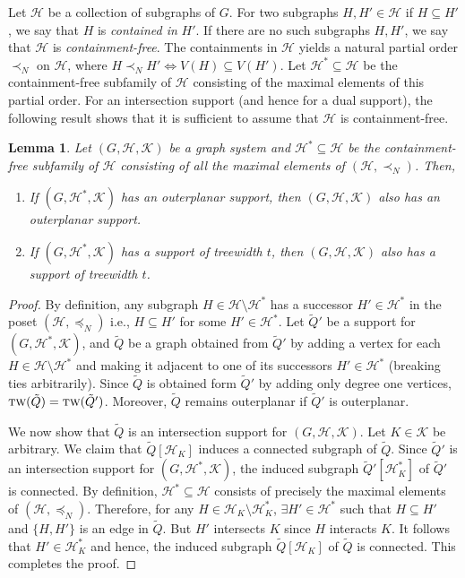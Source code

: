 \documentclass[12pt]{article}
\newcommand{\tw}{\textsc{tw}}
\newtheorem{lemma}[theorem]{Lemma}
\theoremstyle{case}
\begin{document}
Let $\mathcal{H}$ be a collection of subgraphs of $G$. For two subgraphs $H, H'\in\mathcal{H}$ 
if $H\subseteq H'$, we say that $H$ is \emph{contained in} $H'$. If there are no such subgraphs $H, H'$, we say that
$\mathcal{H}$ is \emph{containment-free}. The containments in $\mathcal{H}$ yields a natural partial order $\prec_N$ on $\mathcal{H}$,
where $H\prec_N H' \Leftrightarrow V(H)\subseteq V(H')$.
Let $\mathcal{H}^*\subseteq\mathcal{H}$ be the containment-free subfamily of $\mathcal{H}$ consisting of the maximal elements of this partial order.
For an intersection support (and hence for a dual support), 
the following result 
shows that it is sufficient to 
assume that $\mathcal{H}$ is containment-free.

\begin{lemma}
\label{lem:contfree}
Let $(G,\mathcal{H,K})$ be a graph system and  $\mathcal{H}^*\subseteq\mathcal{H}$ be the containment-free
subfamily of $\mathcal{H}$ consisting of all the maximal elements of $(\mathcal{H},\prec_N)$.
Then,
\begin{enumerate}
    \item If $(G,\mathcal{H^*,K})$ has an outerplanar support, then $(G,\mathcal{H,K})$ also has an outerplanar support.
    \item If $(G,\mathcal{H^*,K})$ has a support of treewidth $t$, then $(G,\mathcal{H,K})$ also has a support of treewidth $t$.
\end{enumerate}

\end{lemma}
\begin{proof}
By definition, any subgraph $H\in\mathcal{H}\setminus\mathcal{H}^*$ has a successor $H'\in\mathcal{H}^*$ in the poset $(\mathcal{H},\preceq_N)$ i.e., $H\subseteq H'$ for some $H'\in\mathcal{H}^*$.
Let $\tilde{Q}'$ be a support for $(G,\mathcal{H}^*,\mathcal{K})$, and $\tilde{Q}$ be a graph obtained from $\tilde{Q}'$ by adding a vertex for each $H\in\mathcal{H}\setminus\mathcal{H}^*$ and making it adjacent to one of its successors $H'\in\mathcal{H}^*$ (breaking ties arbitrarily).
Since $\tilde{Q}$ is obtained form $\tilde{Q}'$ by adding only degree one vertices, $\tw(\tilde{Q})=\tw(\tilde{Q}')$. Moreover, $\tilde{Q}$ remains outerplanar if $\tilde{Q}'$ is outerplanar.

We now show that $\tilde{Q}$ is an intersection support for $(G,\mathcal{H,K})$.
Let $K\in\mathcal{K}$ be arbitrary.
We claim that $\tilde{Q}[\mathcal{H}_K]$ induces a connected subgraph of $\tilde{Q}$.
Since $\tilde{Q}'$ is an intersection support for $(G,\mathcal{H}^*,\mathcal{K})$, the induced subgraph $\tilde{Q}'[\mathcal{H}^*_K]$ of $\tilde{Q}'$ is connected.
By definition, $\mathcal{H}^*\subseteq\mathcal{H}$ consists of precisely the maximal elements of $(\mathcal{H},\preceq_N)$.
Therefore, for any $H\in\mathcal{H}_K\setminus\mathcal{H}^*_K$, $\exists H'\in\mathcal{H}^*$ such that $H\subseteq H'$ and $\{H,H'\}$ is an edge in $\tilde{Q}$.
But $H'$ intersects $K$ since $H$ interacts $K$.
It follows that $H'\in\mathcal{H}^*_K$ and hence, the induced subgraph $\tilde{Q}[\mathcal{H}_K]$ of $\tilde{Q}$ is connected.
This completes the proof.
\end{proof}
\end{document}
